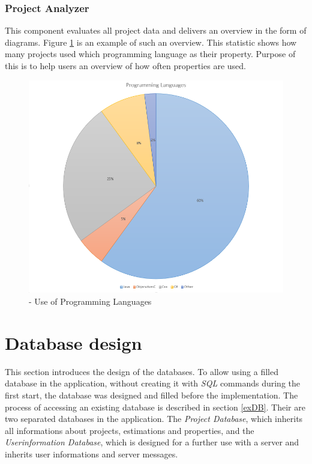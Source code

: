 \subsubsection{\textbf{Project Analyzer}}

This component evaluates all project data and delivers an overview in the form of diagrams. Figure \ref{fig:statistic} is an example of such an overview. This statistic shows how many projects used which programming language as their property. Purpose of this is to help users an overview of how often properties are used.

\begin{figure}[h] 
	\centering 
	\includegraphics[width=14cm]{images/percentage.png} 
	\caption{- Use of Programming Languages} 
	\label{fig:statistic}
\end{figure}

\section{Database design}

This section introduces the design of the databases. To allow using a filled database in the application, without creating it with \textit{SQL} commands during the first start, the database was designed and filled before the implementation. The process of accessing an existing database is described in section \ref{exDB}. Their are two separated databases in the application. The \textit{Project Database}, which inherits all informations about projects, estimations and properties, and the \textit{Userinformation Database}, which is designed for a further use with a server and inherits user informations and server messages.\\

